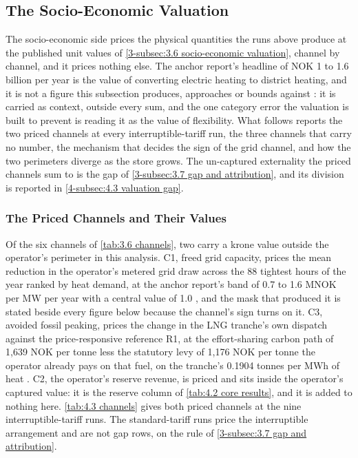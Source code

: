 \subsection{The Socio-Economic Valuation}
\label{4-subsec:4.2 triangulated social value}

The socio-economic side prices the physical quantities the runs above produce at the published unit values of \autoref{3-subsec:3.6 socio-economic valuation}, channel by channel, and it prices nothing else. The anchor report's headline of NOK 1 to 1.6 billion per year is the value of converting electric heating to district heating, and it is not a figure this subsection produces, approaches or bounds against \cite{Thema_fjernvarme_2024}: it is carried as context, outside every sum, and the one category error the valuation is built to prevent is reading it as the value of flexibility. What follows reports the two priced channels at every interruptible-tariff run, the three channels that carry no number, the mechanism that decides the sign of the grid channel, and how the two perimeters diverge as the store grows. The un-captured externality the priced channels sum to is the gap of \autoref{3-subsec:3.7 gap and attribution}, and its division is reported in \autoref{4-subsec:4.3 valuation gap}.

\subsubsection{The Priced Channels and Their Values}
\label{4-subsec:4.2.1 channels}

Of the six channels of \autoref{tab:3.6 channels}, two carry a krone value outside the operator's perimeter in this analysis. C1, freed grid capacity, prices the mean reduction in the operator's metered grid draw across the 88 tightest hours of the year ranked by heat demand, at the anchor report's band of 0.7 to 1.6 MNOK per MW per year with a central value of 1.0 \cite{Thema_fjernvarme_2024}, and the mask that produced it is stated beside every figure below because the channel's sign turns on it. C3, avoided fossil peaking, prices the change in the LNG tranche's own dispatch against the price-responsive reference R1, at the effort-sharing carbon path of 1{,}639 NOK per tonne less the statutory levy of 1{,}176 NOK per tonne the operator already pays on that fuel, on the tranche's 0.1904 tonnes per MWh of heat \cite{finansdepartementet_karbonprisbaner_2025}. C2, the operator's reserve revenue, is priced and sits inside the operator's captured value: it is the reserve column of \autoref{tab:4.2 core results}, and it is added to nothing here. \autoref{tab:4.3 channels} gives both priced channels at the nine interruptible-tariff runs. The standard-tariff runs price the interruptible arrangement and are not gap rows, on the rule of \autoref{3-subsec:3.7 gap and attribution}.

